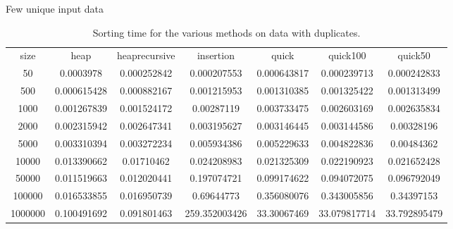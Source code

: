 \documentclass[a4paper,12pt]{article}
\begin{document}
\begin{table}[h]
\caption {Few unique input data} 
\begin{tabular}{ccccccc}
size & heap & heaprecursive & insertion & quick & quick100 & quick50 \\
50 & 0.0003978 & 0.000252842 & 0.000207553 & 0.000643817 & 0.000239713 & 0.000242833 \\
500 & 0.000615428 & 0.000882167 & 0.001215953 & 0.001310385 & 0.001325422 & 0.001313499 \\
1000 & 0.001267839 & 0.001524172 & 0.00287119 & 0.003733475 & 0.002603169 & 0.002635834 \\
2000 & 0.002315942 & 0.002647341 & 0.003195627 & 0.003146445 & 0.003144586 & 0.00328196 \\
5000 & 0.003310394 & 0.003272234 & 0.005934386 & 0.005229633 & 0.004822836 & 0.00484362 \\
10000 & 0.013390662 & 0.01710462 & 0.024208983 & 0.021325309 & 0.022190923 & 0.021652428 \\
50000 & 0.011519663 & 0.012020441 & 0.197074721 & 0.099174622 & 0.094072075 & 0.096792049 \\
100000 & 0.016533855 & 0.016950739 & 0.69644773 & 0.356080076 & 0.343005856 & 0.34397153 \\
1000000 & 0.100491692 & 0.091801463 & 259.352003426 & 33.30067469 & 33.079817714 & 33.792895479 \\
\end{tabular}
\caption{Sorting time for the various methods on data with duplicates.}
\end{table}
\end{document}
